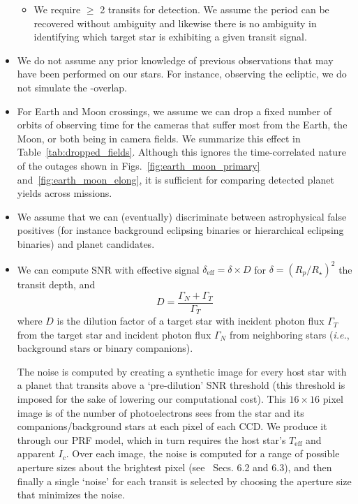 \begin{itemize}
\begin{itemize}
	\item We require $\geq$ 2 transits for detection.  We assume
          the period can be recovered without ambiguity and likewise
          there is no ambiguity in identifying which target star is
          exhibiting a given transit signal.
          
	\end{itemize}

	\item We do not assume any prior knowledge of previous
          observations that may have been performed on our stars.  For
          instance, observing the ecliptic, we do not simulate the
          \tess\!-\ktwo overlap.
          
	\item For Earth and Moon crossings, we assume we can drop a
          fixed number of orbits of observing time for the cameras
          that suffer most from the Earth, the Moon, or both being in
          \tesss camera fields. We summarize this effect in
          Table~\ref{tab:dropped_fields}. Although this ignores the
          time-correlated nature of the outages shown in
          Figs.~\ref{fig:earth_moon_primary}
          and~\ref{fig:earth_moon_elong}, it is sufficient for
          comparing detected planet yields across missions.
          
	\item We assume that we can (eventually) discriminate between
          astrophysical false positives (for instance background
          eclipsing binaries or hierarchical eclipsing binaries) and
          planet candidates.
          
	\item We can compute SNR with effective signal
          $\delta_\text{eff} = \delta \times D$ for
          $\delta=(R_p/R_\star)^2$ the transit depth, and
	  \begin{equation}
	D = \frac{\Gamma_N + \Gamma_T}{\Gamma_T}
	\label{eq:dilution}
	\end{equation}
	where $D$ is the dilution factor of a target star with
        incident photon flux $\Gamma_T$ from the target star and
        incident photon flux $\Gamma_N$ from neighboring stars 
        (\textit{i.e.}, background stars or binary companions).
	
	The noise is computed by creating a synthetic image for every
        host star with a planet that transits above a `pre-dilution'
        SNR threshold (this threshold is imposed for the sake of
        lowering our computational cost).  This $16\times16$ pixel
        image is of the number of photoelectrons \tess sees from the
        star and its companions/background stars at each pixel of each
        CCD.  We produce it through our PRF model, which in turn
        requires the host star's $T_\mathrm{eff}$ and apparent $I_c$.
        Over each image, the noise is computed for a range of possible
        aperture sizes about the brightest pixel
        (see~ Secs. 6.2 and 6.3), and then
        finally a single `noise' for each transit is selected by
        choosing the aperture size that minimizes the noise.

\end{itemize}
